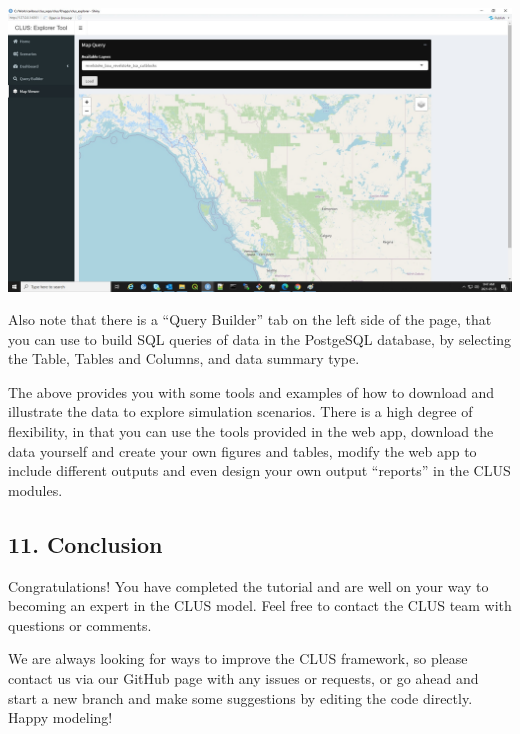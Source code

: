 \documentclass[
]{article}
\begin{document}
\includegraphics{images/clus_explorer_map.jpg}

Also note that there is a ``Query Builder'' tab on the left side of the
page, that you can use to build SQL queries of data in the PostgeSQL
database, by selecting the Table, Tables and Columns, and data summary
type.

The above provides you with some tools and examples of how to download
and illustrate the data to explore simulation scenarios. There is a high
degree of flexibility, in that you can use the tools provided in the web
app, download the data yourself and create your own figures and tables,
modify the web app to include different outputs and even design your own
output ``reports'' in the CLUS modules.

\hypertarget{conclusion}{%
\subsection{11. Conclusion}\label{conclusion}}

Congratulations! You have completed the tutorial and are well on your
way to becoming an expert in the CLUS model. Feel free to contact the
CLUS team with questions or comments.

We are always looking for ways to improve the CLUS framework, so please
contact us via our GitHub page with any issues or requests, or go ahead
and start a new branch and make some suggestions by editing the code
directly. Happy modeling!
\end{document}
